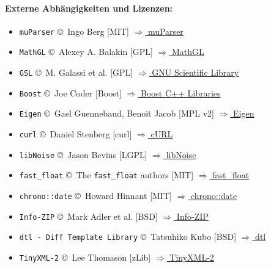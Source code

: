 \documentclass[DIV=17, parskip=half]{scrreprt}
\begin{document}
		\paragraph{Externe Abh\"angigkeiten und Lizenzen:}
		\begin{itemize}
			\item \verb!muParser! \copyright\ Ingo Berg [MIT]
			\href{https://beltoforion.de/en/muparser/}{$\Rightarrow$ muParser}

			\item \verb!MathGL! \copyright\ Alexey A. Balakin [GPL]
			\href{https://mathgl.sourceforge.net/}{$\Rightarrow$ MathGL}

			\item \verb!GSL! \copyright\ M. Galassi et al. [GPL]
			\href{https://www.gnu.org/software/gsl/}{$\Rightarrow$ GNU Scientific Library}

			\item \verb!Boost! \copyright\ Joe Coder [Boost]
			\href{https://www.boost.org/}{$\Rightarrow$ Boost C++ Libraries}

			\item \verb!Eigen! \copyright\ Gael Guennebaud, Benoit Jacob [MPL v2]
			\href{https://eigen.tuxfamily.org/}{$\Rightarrow$ Eigen}

			\item \verb!curl! \copyright\ Daniel Stenberg [curl]
			\href{https://curl.se/libcurl/}{$\Rightarrow$ cURL}

			\item \verb!libNoise! \copyright\ Jason Bevins [LGPL]
			\href{https://libnoise.sourceforge.net/}{$\Rightarrow$ libNoise}

			\item \verb!fast_float! \copyright\ The \verb!fast_float! authors [MIT]
			\href{https://github.com/fastfloat/fast_float}{$\Rightarrow$ fast\_float}

			\item \verb!chrono::date! \copyright\ Howard Hinnant [MIT]
			\href{https://github.com/HowardHinnant/date}{$\Rightarrow$ chrono::date}

			\item \verb!Info-ZIP! \copyright\ Mark Adler et al. [BSD]
			\href{https://infozip.sourceforge.net/}{$\Rightarrow$ Info-ZIP}

			\item \verb!dtl - Diff Template Library! \copyright\ Tatsuhiko Kubo [BSD]
			\href{https://github.com/cubicdaiya/dtl}{$\Rightarrow$ dtl}

			\item \verb!TinyXML-2! \copyright\ Lee Thomason [zLib]
			\href{https://github.com/leethomason/tinyxml2}{$\Rightarrow$ TinyXML-2}


\end{itemize}
\end{document}

